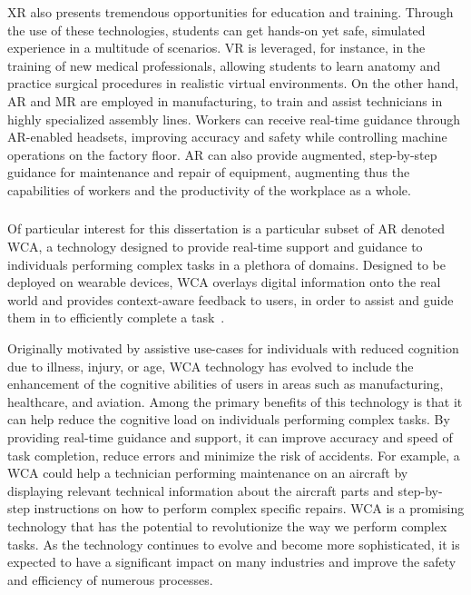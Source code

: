 \gls{XR} also presents tremendous opportunities for education and training.
Through the use of these technologies, students can get hands-on yet safe, simulated experience in a multitude of scenarios.
\gls{VR} is leveraged, for instance, in the training of new medical professionals, allowing students to learn anatomy and practice surgical procedures in realistic virtual environments.
On the other hand, \gls{AR} and \gls{MR} are employed in manufacturing, to train and assist technicians in highly specialized assembly lines.
Workers can receive real-time guidance through \gls{AR}-enabled headsets, improving accuracy and safety while controlling machine operations on the factory floor.
\gls{AR} can also provide augmented, step-by-step guidance for maintenance and repair of equipment, augmenting thus the capabilities of workers and the productivity of the workplace as a whole.

\subsubsection{}\label{sec:background:wca}

Of particular interest for this dissertation is a particular subset of \gls{AR} denoted \acf{WCA}, a technology designed to provide real-time support and guidance to individuals performing complex tasks in a plethora of domains.
Designed to be deployed on wearable devices, \gls{WCA} overlays digital information onto the real world and provides context-aware feedback to users, in order to assist and guide them in to efficiently complete a task~\cite{ha2014towards,chen2015early,chen2018application,wang2020scaling}.

Originally motivated by assistive use-cases for individuals with reduced cognition due to illness, injury, or age, \gls{WCA} technology has evolved to include the enhancement of the cognitive abilities of users in areas such as manufacturing, healthcare, and aviation.
Among the primary benefits of this technology is that it can help reduce the cognitive load on individuals performing complex tasks.
By providing real-time guidance and support, it can improve accuracy and speed of task completion, reduce errors and minimize the risk of accidents.
For example, a \gls{WCA} could help a technician performing maintenance on an aircraft by displaying relevant technical information about the aircraft parts and step-by-step instructions on how to perform complex specific repairs.
\gls{WCA} is a promising technology that has the potential to revolutionize the way we perform complex tasks.
As the technology continues to evolve and become more sophisticated, it is expected to have a significant impact on many industries and improve the safety and efficiency of numerous processes.

